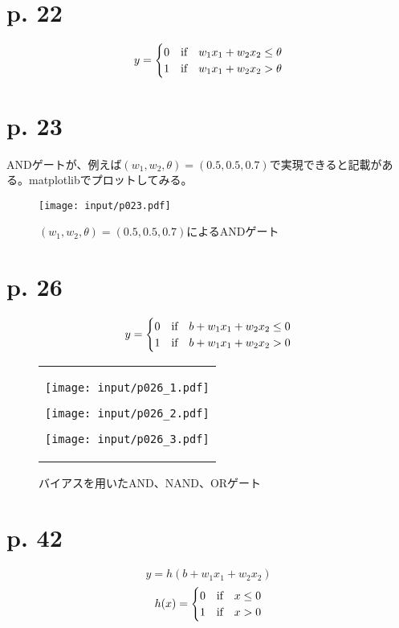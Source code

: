 \documentclass[uplatex,dvipdfmx]{jsarticle} \usepackage{amsmath,amssymb,bm}
\begin{document}
\section*{p. 22}
$$y = 
\begin{cases}
0 & \text{if\quad} w_1x_1+w_2x_2\leq\theta\\
1 & \text{if\quad} w_1x_1+w_2x_2>\theta
\end{cases}
$$

\section*{p. 23}
ANDゲートが、例えば$(w_1,w_2,\theta)=(0.5,0.5,0.7)$で実現できると記載がある。matplotlibでプロットしてみる。



\begin{figure} \centering
\texttt{[image: input/p023.pdf]}
\caption{$(w_1,w_2,\theta)=(0.5,0.5,0.7)$によるANDゲート}
\end{figure}

\section*{p. 26}
$$y = 
\begin{cases}
0 & \text{if\quad} b+w_1x_1+w_2x_2\leq0\\
1 & \text{if\quad} b+w_1x_1+w_2x_2>0
\end{cases}
$$


\begin{figure} \centering
\begin{tabular}{c}
\begin{minipage}{0.3\hsize}
\texttt{[image: input/p026\_1.pdf]}
\end{minipage}
\begin{minipage}{0.3\hsize}
\texttt{[image: input/p026\_2.pdf]}
\end{minipage}
\begin{minipage}{0.3\hsize}
\texttt{[image: input/p026\_3.pdf]}
\end{minipage}


\end{tabular}
\caption{バイアスを用いたAND、NAND、ORゲート}
\end{figure}

\section*{p. 42}
$$y=h(b+w_1x_1+w_2x_2)$$
$$h(x) = 
\begin{cases}
0 & \text{if\quad} x\leq0\\
1 & \text{if\quad} x>0
\end{cases}
$$
\end{document}
